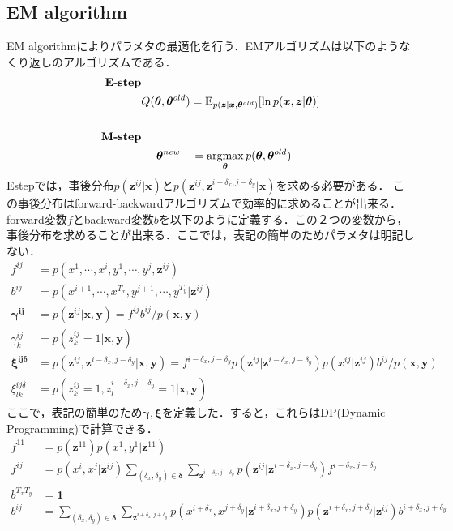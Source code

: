 \subsection{EM algorithm}
\label{subsec:em}
EM algorithmによりパラメタの最適化を行う．EMアルゴリズムは以下のようなくり返しのアルゴリズムである．
\begin{align}
\mbox{\textbf{E-step}}&\\
&Q(\bm{\theta},\bm{\theta}^{old}) =
  \mathbb{E}_{p(\bm{z}|\bm{x}, \bm{\theta}^{old})}[\ln p(\bm{x}, \bm{z}| \bm{\theta})]\\ \\
\mbox{\textbf{M-step}}&\\
& \ \ \ \ \bm{\theta}^{new} \ \ \  = \mathop{\rm argmax}\limits_{\bm{\theta}} p(\bm{\theta}, \bm{\theta}^{old})
\end{align}
Estepでは，事後分布$p(\bm{z}^{ij}|\bm{x})$と$p(\bm{z}^{ij}, \bm{z}^{i-\delta_x, j-\delta_y}|\bm{x})$を求める必要がある．
この事後分布はforward-backwardアルゴリズムで効率的に求めることが出来る．forward変数$
f$とbackward変数$b$を以下のように定義する．この２つの変数から，事後分布を求めることが出来る．ここでは，表記の簡単のためパラメタは明記しない．
\begin{align}
f^{ij} &= p(x^{1},\cdots,x^i, y^1,\cdots,y^{j}, \bm{z}^{ij})\\
b^{ij} &= p(x^{i+1},\cdots,x^{T_x}, y^{j+1},\cdots,y^{T_y}| \bm{z}^{ij})\\
\bm{\gamma^{ij}} &= p(\bm{z}^{ij}|\bm{x},\bm{y}) = f^{ij} b^{ij}/p(\bm{x},\bm{y})\\
\gamma^{ij}_k &= p(z^{ij}_k = 1|\bm{x},\bm{y})\\
\bm{\xi^{ij\delta}} &= 
p(\bm{z}^{ij}, \bm{z}^{i-\delta_x, j-\delta_y}|\bm{x},\bm{y}) = 
  f^{i-\delta_x, j-\delta_y} p(\bm{z}^{ij}|\bm{z}^{i-\delta_x, j-\delta_y}) p(x^{ij}|\bm{z}^{ij})b^{ij}  / p(\bm{x},\bm{y})\\
\xi^{ij\delta}_{lk} &= p(z^{ij}_k = 1, z^{i-\delta_x, j-\delta_y}_{l}=1|\bm{x},\bm{y})
\end{align}
ここで，表記の簡単のため$\bm{\gamma},\bm{\xi}$を定義した．すると，これらはDP(Dynamic Programming)で計算できる．
\begin{align}
f^{11} &= p(\bm{z}^{11})p(x^1,y^1|\bm{z}^{11})\\
f^{ij} &=
  p(x^i, x^j|\bm{z}^{ij})
  \sum_{(\delta_x,\delta_y)\in \bm{\delta}}  \sum_{\bm{z}^{i-\delta_x, j-\delta_y}}
  p(\bm{z}^{ij}|\bm{z}^{i-\delta_x, j-\delta_y})f^{i-\delta_x, j-\delta_y}\\
b^{T_xT_y} &= \bm{1} \\
b^{ij} &=
   \sum_{(\delta_x,\delta_y)\in \bm{\delta}}  \sum_{\bm{z}^{i+\delta_x, j+\delta_y}}
         p(x^{i+\delta_x}, x^{j+\delta_y}|\bm{z}^{i+\delta_x, j+\delta_y})
  p(\bm{z}^{i+\delta_x, j+\delta_y}|\bm{z}^{ij})b^{i+\delta_x, j+\delta_y}
\end{align}
